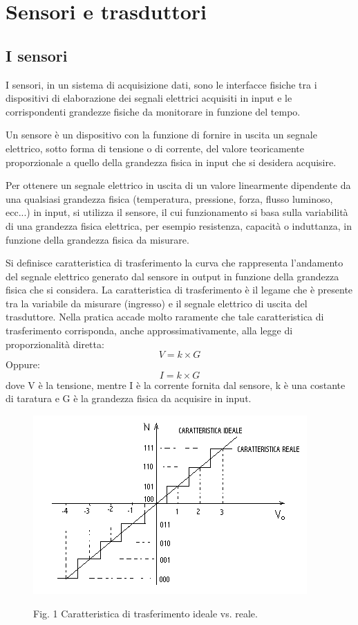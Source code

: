 \documentclass[a4paper]{report} %
\begin{document}
\section{Sensori e trasduttori}
\subsection{I sensori}
I sensori, in un sistema di acquisizione dati, sono le interfacce fisiche tra i dispositivi di elaborazione dei segnali elettrici acquisiti in input e le corrispondenti grandezze fisiche da monitorare in funzione del tempo. 

Un sensore è un dispositivo con la funzione di fornire in uscita un segnale elettrico, sotto forma di tensione o di corrente, del valore teoricamente proporzionale a quello della grandezza fisica in input che si desidera acquisire. 

Per ottenere un segnale elettrico in uscita di un valore linearmente dipendente da una qualsiasi grandezza fisica (temperatura, pressione, forza, flusso luminoso, ecc...) in input, si utilizza il sensore, il cui funzionamento si basa sulla variabilità di una grandezza fisica elettrica, per esempio resistenza, capacità o induttanza, in funzione della grandezza fisica da misurare.

Si definisce caratteristica di trasferimento la curva che rappresenta l'andamento del segnale elettrico generato dal sensore in output in funzione della grandezza fisica che si considera.
La caratteristica di trasferimento è il legame che è presente tra la variabile da misurare (ingresso) e il segnale elettrico di uscita del trasduttore. 
Nella pratica accade molto raramente che tale caratteristica di trasferimento corrisponda, anche approssimativamente, alla legge di proporzionalità diretta: 
\begin{equation}
V = k \times G
\end{equation}
Oppure:
\begin{equation}
I = k \times G
\end{equation}
dove V è la tensione, mentre I è la corrente fornita dal sensore, k è una costante di taratura e G è la grandezza fisica da acquisire in input.

\begin{figure}
\centering
\includegraphics[scale=.8]{Immagini/CarTrasferimento.png}

Fig. 1 Caratteristica di trasferimento ideale vs. reale.
\end{figure}
\end{document}
